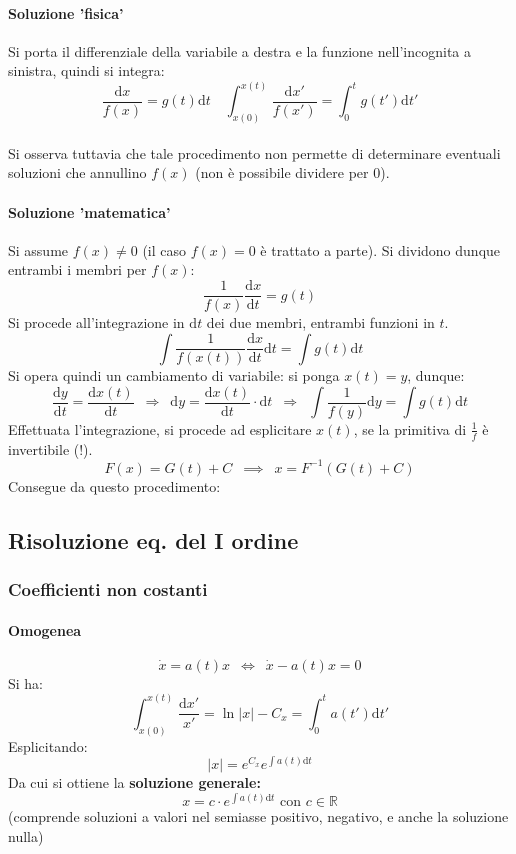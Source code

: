 \documentclass[10pt]{article}
\theoremstyle{plain}
\begin{document}
\paragraph*{Soluzione 'fisica'}
Si porta il differenziale della variabile a destra e la funzione nell'incognita a sinistra, quindi si integra:
\[\frac{\textrm{d}x}{f(x)} = g(t) \textrm{d}t \quad \int_{x(0)}^{x(t)}\frac{\textrm{d}x'}{f(x')} = \int_0^t g(t') \textrm{d}t'\]
\\Si osserva tuttavia che tale procedimento non permette di determinare eventuali soluzioni che annullino $f(x)$ (non è possibile dividere per $0$).

\paragraph*{Soluzione 'matematica'}
Si assume $f(x) \neq 0$ (il caso $f(x) = 0$ è trattato a parte). Si dividono dunque entrambi i membri per $f(x)$:
\[\frac{1}{f(x)}\frac{\textrm{d}x}{\textrm{d}t} = g(t)\]
Si procede all'integrazione in $\textrm{d}t$ dei due membri, entrambi funzioni in $t$.
\[\int \frac{1}{f(x(t))}\frac{\textrm{d}x}{\textrm{d}t} \textrm{d}t = \int g(t) \textrm{d}t\]
Si opera quindi un cambiamento di variabile: si ponga $x(t) = y$, dunque:
\[\frac{\textrm{d}y}{\textrm{d}t} = \frac{\textrm{d}x(t)}{\textrm{d}t} \enspace \Rightarrow \enspace \textrm{d}y = \frac{\textrm{d}x(t)}{\textrm{d}t} \cdot \textrm{d}t \enspace \Rightarrow \enspace \int \frac{1}{f(y)}\textrm{d}y  = \int g(t) \textrm{d}t\]
Effettuata l'integrazione, si procede ad esplicitare $x(t)$, se la primitiva di $\frac{1}{f}$ è invertibile (!).
\[F(x) = G(t) + C \enspace \implies \enspace x = F^{-1}(G(t) + C)\]
Consegue da questo procedimento:

\subsection{Risoluzione eq. del I ordine}
\subsubsection{Coefficienti non costanti}
\paragraph*{Omogenea}
\[\dot x = a(t) x \enspace \Leftrightarrow \enspace \dot x - a(t) x = 0\]
Si ha:
\[\int_{x(0)}^{x(t)} \frac{\textrm{d}x'}{x'} = \ln|x| - C_x = \int_0^t a(t') \textrm{d}t'\]
Esplicitando:
\[|x| = e^{C_x}e^{\int a(t) \textrm{d}t}\]
Da cui si ottiene la \textbf{soluzione generale:}
\[\boxed{x = c \cdot e^{\int a(t) \textrm{d}t}} \textrm{ con } c \in \mathbb{R}\]
(comprende soluzioni a valori nel semiasse positivo, negativo, e anche la soluzione nulla)
\end{document}
